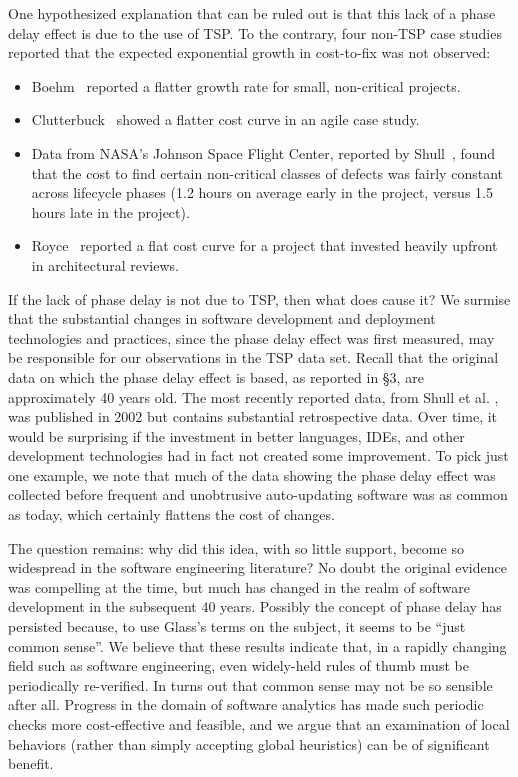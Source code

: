 \documentclass{sig-alternate}
\newcommand{\bi}{\begin{itemize}}%
\newcommand{\ei}{\end{itemize}}
\begin{document}
One hypothesized explanation that can be ruled out is that this lack of
a phase delay effect is due to the use of TSP.
  To the contrary, four non-TSP  case studies reported that the expected exponential growth in cost-to-fix was not observed:
  \bi
  \item
  Boehm~\cite{Boehm80} reported a flatter growth rate for small, non-critical projects.
  \item
  Clutterbuck~\cite{Clutterbuck09} showed a flatter cost curve in an agile case study. 
  \item 
  Data from NASA's Johnson Space Flight Center, reported by Shull~\cite{Shull02}, found that the cost to find certain non-critical classes of defects was fairly constant across lifecycle phases (1.2 hours on average early in the project, versus 1.5 hours late in the project). 
  \item
  Royce~\cite{Royce98} reported a flat cost curve for a project that invested heavily upfront in architectural reviews.
\ei
If the lack of phase delay is not due to TSP, then what does cause it?
We surmise that the substantial changes in software development and deployment technologies and practices, since the phase delay effect was first measured, may be responsible for our observations in the TSP data set. Recall that the original data on which the phase delay effect is based, as reported in \S3, are approximately 40 years old. The most recently reported data, from Shull et al. \cite{Shull02}, was published in 2002 but contains substantial retrospective data. Over time, it would be surprising if the investment in better languages, IDEs, and other development technologies had in fact not created some improvement. To pick just one example, we note that much of the data showing the phase delay effect was collected before frequent and unobtrusive auto-updating software was as common as today, which certainly flattens the cost of changes.



The question remains: why did this idea, with so little support, become so widespread in the software engineering literature? No doubt the original evidence was compelling at the time, but much has changed in the realm of software development in the subsequent 40 years. Possibly the concept of phase delay has persisted because, to use Glass's terms on the subject, it seems to be ``just common sense''\cite{glass02}. 
We believe that these results indicate that, in a rapidly changing field such as software engineering, even widely-held rules of thumb must be periodically re-verified. In turns out that common sense may not be so sensible after all.
Progress in the domain of software analytics has made such periodic checks more cost-effective and feasible, and we argue that an examination of local behaviors (rather than simply accepting global heuristics) can be of significant benefit.
\end{document}

